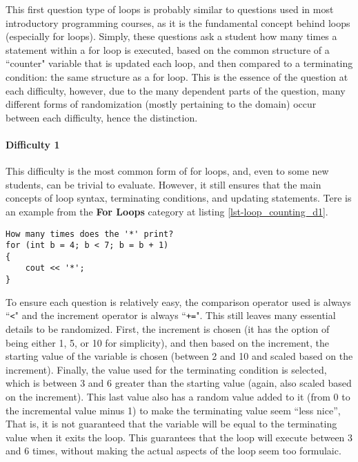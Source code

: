 \documentclass{article}
\begin{document}
This first question type of loops is probably similar to questions used in most introductory programming courses, as it is the fundamental concept behind loops (especially for loops). Simply, these
questions ask a student how many times a statement within a for loop is executed, based on the common structure of a ``counter" variable that is updated each loop, and then compared to a
terminating condition: the same structure as a for loop. This is the essence of the question at each difficulty, however, due to the many dependent parts of the question, many different forms 
of randomization (mostly pertaining to the domain) occur between each difficulty, hence the distinction.

\paragraph{Difficulty 1} \hfill \par 
This difficulty is the most common form of for loops, and, even to some new students, can be trivial to evaluate. However, it still ensures that the main concepts of loop syntax, terminating 
conditions, and updating statements. Tere is an example from the \textbf{For Loops} category at listing \ref{lst-loop_counting_d1}.

\begin{lstlisting}[caption={Loop Counting Difficulty 1 Example}, label=lst-loop_counting_d1]
How many times does the '*' print? 
for (int b = 4; b < 7; b = b + 1)
{
	cout << '*';
} 
\end{lstlisting}


To ensure each question is relatively easy, the comparison operator used is always ``\verb;<;" and the increment operator is always ``\verb;+=;". This still leaves many essential details to be 
randomized. First, the increment is chosen (it has the option of being either 1, 5, or 10 for simplicity), and then based on the increment, the starting value of the variable is chosen (between 2 and 10 and scaled based on the increment). Finally, the value used for the terminating condition is selected, which is between 3 and 6 greater than the starting value (again, also scaled based 
on the increment). This last value also has a random value added to it (from 0 to the incremental value minus 1) to make the terminating value seem ``less nice'', That is, it is not guaranteed
that the variable will be equal to the terminating value when it exits the loop. This guarantees that the loop will execute between 3 and 6 times, without making the actual aspects of the loop 
seem too formulaic. 
\end{document}
